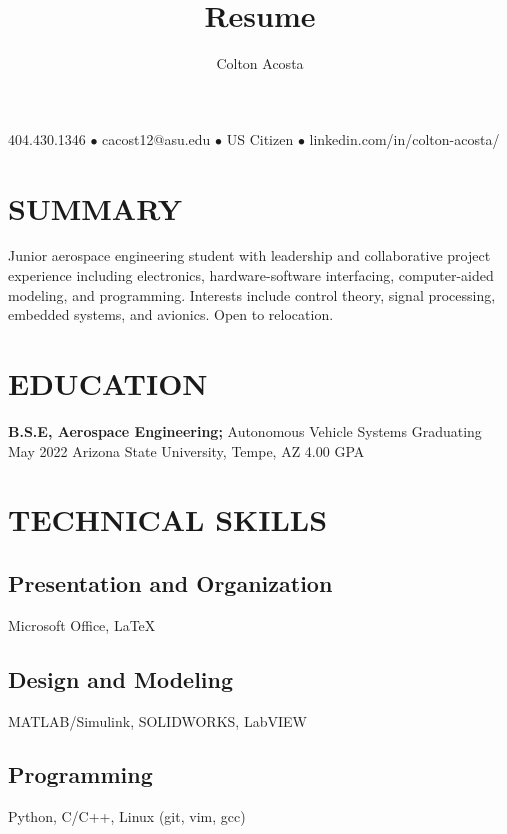 \documentclass{article}
\makeatletter
\renewcommand{\maketitle}{
	\begin{center}
		{\huge\bfseries
			\theauthor}
			
		404.430.1346 $\bullet$ cacost12@asu.edu $\bullet$ US Citizen $\bullet$ linkedin.com/in/colton-acosta/
	\end{center}
}
\makeatother
\begin{document}
\title{Resume}
\author{Colton Acosta}
\maketitle
\section{SUMMARY}
Junior aerospace engineering student with leadership and collaborative project experience including electronics, hardware-software interfacing, computer-aided modeling, and programming. Interests include control theory, signal processing, embedded systems, and avionics. Open to relocation. 
\section{EDUCATION}
\textbf{B.S.E, Aerospace Engineering;} Autonomous Vehicle Systems
\hfill 
Graduating May 2022
\linebreak
Arizona State University, Tempe, AZ 
\hfill
4.00 GPA

\section{TECHNICAL SKILLS}
\subsection{Presentation and Organization}
Microsoft Office,  {\LaTeX}
\subsection{Design and Modeling}
MATLAB/Simulink, SOLIDWORKS, LabVIEW
\subsection{Programming} 
Python, C/C++, Linux (git, vim, gcc)
\end{document}
